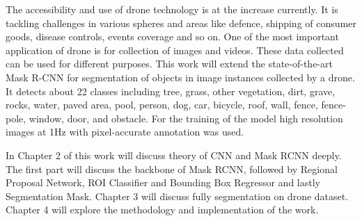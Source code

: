 The accessibility and use of drone technology is at the increase currently. It is tackling challenges in various spheres and areas like defence, shipping of consumer goods, disease controls, events coverage and so on. One of the most important application of drone is for collection of images and videos. These data collected can be used for different purposes. This work will extend the state-of-the-art Mask R-CNN for segmentation of objects in image instances collected by a drone. It detects about 22 classes including tree, grass, other vegetation, dirt, grave, rocks, water, paved area, pool, person, dog, car, bicycle, roof, wall, fence, fence-pole, window, door, and obstacle. For the training of the model high resolution images at 1Hz with pixel-accurate annotation was used.

In Chapter 2 of this work will discuss theory of CNN and Mask RCNN deeply. The first part will discuss the backbone of Mask RCNN, followed by Regional Proposal Network, ROI Classifier and Bounding Box Regressor and lastly Segmentation Mask.
Chapter 3 will discuss fully segmentation on drone dataset. Chapter 4 will explore the methodology and implementation of the work.


